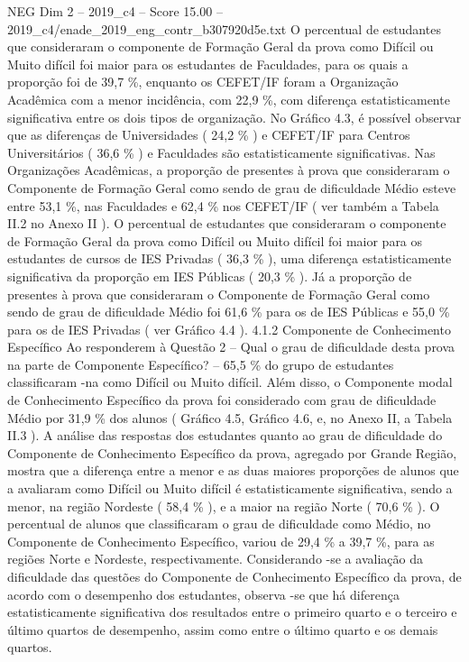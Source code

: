 \begin{textsample}{NEG Dim 2 – 2019\_c4 – Score 15.00 – 2019\_c4/enade\_2019\_eng\_contr\_b307920d5e.txt}
O percentual de estudantes que consideraram o componente de Formação Geral da prova como Difícil ou Muito difícil foi maior para os estudantes de Faculdades, para os quais a proporção foi de 39,7 \%, enquanto os CEFET/IF foram a Organização Acadêmica com a menor incidência, com 22,9 \%, com diferença estatisticamente significativa entre os dois tipos de organização.
No Gráfico 4.3, é possível observar que as diferenças de Universidades ( 24,2 \% ) e CEFET/IF para Centros Universitários ( 36,6 \% ) e Faculdades são estatisticamente significativas.
Nas Organizações Acadêmicas, a proporção de presentes à prova que consideraram o Componente de Formação Geral como sendo de grau de dificuldade Médio esteve entre 53,1 \%, nas Faculdades e 62,4 \% nos CEFET/IF ( ver também a Tabela II.2 no Anexo II ).
O percentual de estudantes que consideraram o componente de Formação Geral da prova como Difícil ou Muito difícil foi maior para os estudantes de cursos de IES Privadas ( 36,3 \% ), uma diferença estatisticamente significativa da proporção em IES Públicas ( 20,3 \% ).
Já a proporção de presentes à prova que consideraram o Componente de Formação Geral como sendo de grau de dificuldade Médio foi 61,6 \% para os de IES Públicas e 55,0 \% para os de IES Privadas ( ver Gráfico 4.4 ). 4.1.2 Componente de Conhecimento Específico Ao responderem à Questão 2 – Qual o grau de dificuldade desta prova na parte de Componente Específico? – 65,5 \% do grupo de estudantes classificaram -na como Difícil ou Muito difícil.
Além disso, o Componente modal de Conhecimento Específico da prova foi considerado com grau de dificuldade Médio por 31,9 \% dos alunos ( Gráfico 4.5, Gráfico 4.6, e, no Anexo II, a Tabela II.3 ).
A análise das respostas dos estudantes quanto ao grau de dificuldade do Componente de Conhecimento Específico da prova, agregado por Grande Região, mostra que a diferença entre a menor e as duas maiores proporções de alunos que a avaliaram como Difícil ou Muito difícil é estatisticamente significativa, sendo a menor, na região Nordeste ( 58,4 \% ), e a maior na região Norte ( 70,6 \% ).
O percentual de alunos que classificaram o grau de dificuldade como Médio, no Componente de Conhecimento Específico, variou de 29,4 \% a 39,7 \%, para as regiões Norte e Nordeste, respectivamente.
Considerando -se a avaliação da dificuldade das questões do Componente de Conhecimento Específico da prova, de acordo com o desempenho dos estudantes, observa -se que há diferença estatisticamente significativa dos resultados entre o primeiro quarto e o terceiro e último quartos de desempenho, assim como entre o último quarto e os demais quartos.

\end{textsample}
